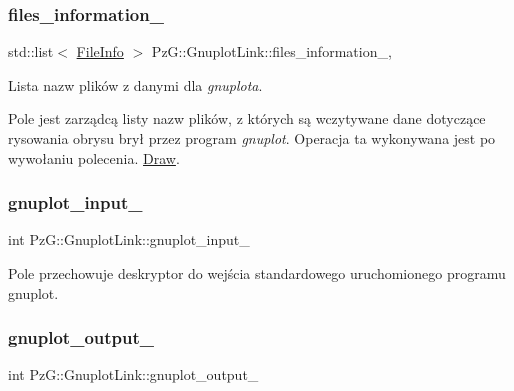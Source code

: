 \subsubsection{\texorpdfstring{files\+\_\+information\+\_\+}{files\_information\_}}
{\footnotesize\ttfamily std\+::list$<$ \hyperlink{class_pz_g_1_1_file_info}{File\+Info} $>$ Pz\+G\+::\+Gnuplot\+Link\+::files\+\_\+information\+\_\+\hspace{0.3cm}{\ttfamily [static]}, {\ttfamily [protected]}}



Lista nazw plików z danymi dla {\itshape gnuplota}. 

Pole jest zarządcą listy nazw plików, z których są wczytywane dane dotyczące rysowania obrysu brył przez program {\itshape gnuplot}. Operacja ta wykonywana jest po wywołaniu polecenia. \hyperlink{class_pz_g_1_1_gnuplot_link_a96321ba10f7ee9c5f55dd17a28143a39}{Draw}. \mbox{\label{class_pz_g_1_1_gnuplot_link_a8b04a557aacb13f62a46bd0cd1233119}} 
\subsubsection{\texorpdfstring{gnuplot\+\_\+input\+\_\+}{gnuplot\_input\_}}
{\footnotesize\ttfamily int Pz\+G\+::\+Gnuplot\+Link\+::gnuplot\+\_\+input\+\_\+\hspace{0.3cm}{\ttfamily [protected]}}

Pole przechowuje deskryptor do wejścia standardowego uruchomionego programu gnuplot. \mbox{\label{class_pz_g_1_1_gnuplot_link_a3ba099cef3e84aab2d3d0f7e99661cca}} 
\subsubsection{\texorpdfstring{gnuplot\+\_\+output\+\_\+}{gnuplot\_output\_}}
{\footnotesize\ttfamily int Pz\+G\+::\+Gnuplot\+Link\+::gnuplot\+\_\+output\+\_\+\hspace{0.3cm}{\ttfamily [protected]}}

